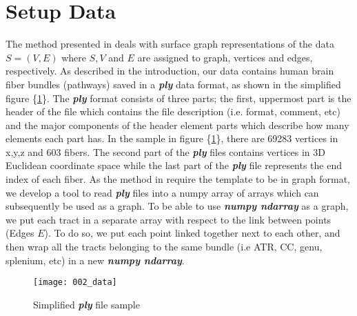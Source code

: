 \documentclass[../structure.tex]{subfiles}
\begin{document}
\section{Setup Data}
The method presented in \cite{Amberg2007} deals with surface graph representations of the data $S=(V,E)$ where $S,V$ and $E$ are assigned to graph, vertices and edges, respectively. As described in the introduction, our data contains human brain fiber bundles (pathways) saved in a \textbf{\textit{ply}} data format, as shown in the simplified figure \{\ref{fig:data}\}. The \textbf{\textit{ply}} format consists of three parts; the first, uppermost part is the header of the file which contains the file description (i.e. format, comment, etc) and the major components of the header element parts which describe how many elements each part has. In the sample in figure \{\ref{fig:data}\}, there are 69283 vertices in x,y,z and 603 fibers. The second part of the \textbf{\textit{ply}} files contains vertices in 3D Euclidean coordinate space while the last part of the \textbf{\textit{ply}} file represents the end index of each fiber. As the method in \cite{Amberg2007} require the template to be in graph format, we develop a tool to read \textbf{\textit{ply}} files into a numpy array of arrays which can subsequently be used as a graph. To be able to use \textbf{\textit{numpy ndarray}} as a graph, we put each tract in a separate array with respect to the link between points (Edges $E$). To do so, we put each point linked together next to each other, and then wrap all the tracts belonging to the same bundle (i.e ATR, CC, genu, splenium, etc) in a new \textbf{\textit{numpy ndarray}}.

\begin{figure}[h!]
\centering
\texttt{[image: 002\_data]}
\captionsetup{justification=centering}
\caption{Simplified \textbf{\textit{ply}} file sample}
\label{fig:data}
\end{figure}
\end{document}
